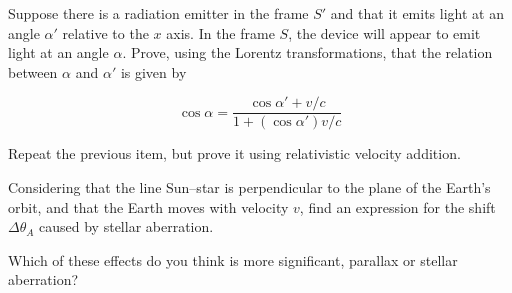 \documentclass[11pt]{article}
\begin{document}
\begin{pproblem}
\begin{alternativas}
        \item Suppose there is a radiation emitter in the frame \(S'\) and that it emits light at an angle \(\alpha'\) relative to the \(x\) axis. In the frame \(S\), the device will appear to emit light at an angle \(\alpha\). Prove, using the Lorentz transformations, that the relation between \(\alpha\) and \(\alpha'\) is given by
        
        \[\cos\alpha = \frac{\cos\alpha' + v/c}{1+(\cos\alpha') v/c}\]

        \item Repeat the previous item, but prove it using relativistic velocity addition.

        \item Considering that the line Sun--star is perpendicular to the plane of the Earth's orbit, and that the Earth moves with velocity \(v\), find an expression for the shift \(\Delta\theta_A\) caused by stellar aberration.
    
        \item Which of these effects do you think is more significant, parallax or stellar aberration?
    \end{alternativas}

    

\end{pproblem}
\end{document}
